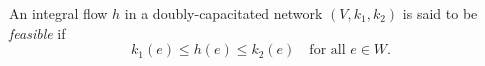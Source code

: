 An integral flow $h$ in a doubly-capacitated network $(V, k_1, k_2)$ is said to be \textit{feasible} if
$$k_1(e) \leq h(e) \leq k_2(e) \quad \text{for all } e \in W.$$
